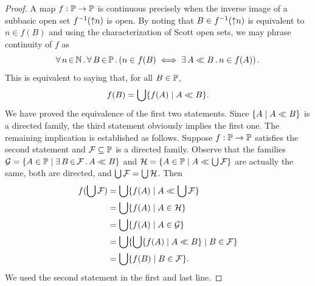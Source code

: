\begin{proof}
  A map $f : \mathbb{P} \to \mathbb{P}$ is continuous precisely when the
  inverse image of a subbasic open set ${f}^{-1}({\uparrow}n)$ is open.
  By noting that $B \in {f}^{-1}({\uparrow}n)$ is equivalent to $n \in
  f(B)$ and using the characterization of Scott open sets, we may
  phrase continuity of $f$ as
  \begin{equation*}
    \forall\, n \,{\in}\, \mathbb{N}\,.\,
      \forall\, B \,{\in}\, \mathbb{P}\,.\left(
        n \in f(B) \iff \exists\, A \ll B\,.\,n \in f(A)
      \right)
   .
  \end{equation*}
  This is equivalent to saying that, for all $B \in \mathbb{P}$,
  \begin{equation*}
    f(B) = \bigcup\nolimits \{f(A) \mid A \ll B\}.
  \end{equation*}
  We have proved the equivalence of the first two statements. Since
  $\{A \mid A \ll B\}$ is a directed family, the third statement
  obviously implies the first one. The remaining implication is
  established as follows. Suppose $f : \mathbb{P} \to \mathbb{P}$ satisfies
  the second statement and $\mathcal{F} \subseteq \mathbb{P}$ is a
  directed family. Observe that the families $\mathcal{G} = \{A \in
    \mathbb{P} \mid \exists\, B \,{\in}\, \mathcal{F}\,.\,A \ll B\}$ and $\mathcal{H}
  = \{A \in \mathbb{P} \mid A \ll \bigcup\nolimits \mathcal{F}\}$ are
  actually the same, both are directed, and $\bigcup\nolimits \mathcal{F} =
  \bigcup\nolimits \mathcal{H}$. Then
  \begin{align*}
    f (\bigcup\nolimits \mathcal{F}) &=
    \bigcup\nolimits \{f(A) \mid A \ll \bigcup\nolimits \mathcal{F}\} \\
    &= \bigcup\nolimits \{f(A) \mid A \in \mathcal{H}\} \\
    &= \bigcup\nolimits \{f(A) \mid A \in \mathcal{G}\} \\
    &= \bigcup\nolimits \{\bigcup\nolimits \{f(A) \mid A \ll B\} \mid B \in \mathcal{F}\} \\
    &= \bigcup\nolimits \{f(B) \mid B \in \mathcal{F}\}.
  \end{align*}
  We used the second statement in the first and last line.
\end{proof}

